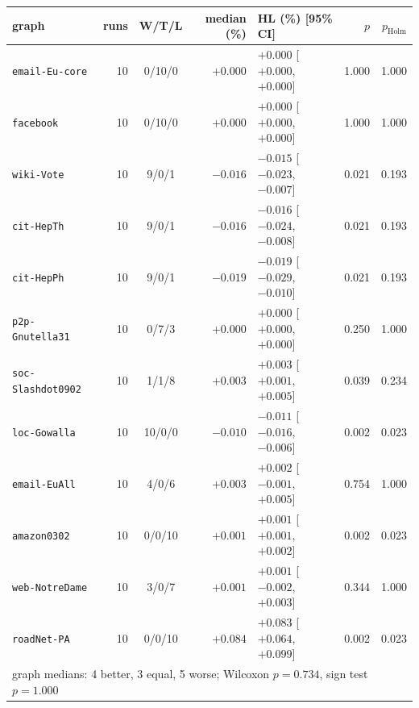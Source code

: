 \begin{tabular}{lrcrlrr}
\toprule
graph & runs & W/T/L & median (\%) & HL (\%) [95\% CI] & $p$ & $p_{\mathrm{Holm}}$ \\
\midrule
\texttt{email-Eu-core} & 10 & 0/10/0 & $+0.000$ & $+0.000$ [$+0.000$, $+0.000$] & 1.000 & 1.000 \\
\texttt{facebook} & 10 & 0/10/0 & $+0.000$ & $+0.000$ [$+0.000$, $+0.000$] & 1.000 & 1.000 \\
\texttt{wiki-Vote} & 10 & 9/0/1 & $-0.016$ & $-0.015$ [$-0.023$, $-0.007$] & 0.021 & 0.193 \\
\texttt{cit-HepTh} & 10 & 9/0/1 & $-0.016$ & $-0.016$ [$-0.024$, $-0.008$] & 0.021 & 0.193 \\
\texttt{cit-HepPh} & 10 & 9/0/1 & $-0.019$ & $-0.019$ [$-0.029$, $-0.010$] & 0.021 & 0.193 \\
\texttt{p2p-Gnutella31} & 10 & 0/7/3 & $+0.000$ & $+0.000$ [$+0.000$, $+0.000$] & 0.250 & 1.000 \\
\texttt{soc-Slashdot0902} & 10 & 1/1/8 & $+0.003$ & $+0.003$ [$+0.001$, $+0.005$] & 0.039 & 0.234 \\
\texttt{loc-Gowalla} & 10 & 10/0/0 & $-0.010$ & $-0.011$ [$-0.016$, $-0.006$] & 0.002 & 0.023 \\
\texttt{email-EuAll} & 10 & 4/0/6 & $+0.003$ & $+0.002$ [$-0.001$, $+0.005$] & 0.754 & 1.000 \\
\texttt{amazon0302} & 10 & 0/0/10 & $+0.001$ & $+0.001$ [$+0.001$, $+0.002$] & 0.002 & 0.023 \\
\texttt{web-NotreDame} & 10 & 3/0/7 & $+0.001$ & $+0.001$ [$-0.002$, $+0.003$] & 0.344 & 1.000 \\
\texttt{roadNet-PA} & 10 & 0/0/10 & $+0.084$ & $+0.083$ [$+0.064$, $+0.099$] & 0.002 & 0.023 \\
\midrule
\multicolumn{7}{l}{graph medians: 4 better, 3 equal, 5 worse; Wilcoxon $p=0.734$, sign test $p=1.000$} \\
\bottomrule
\end{tabular}
